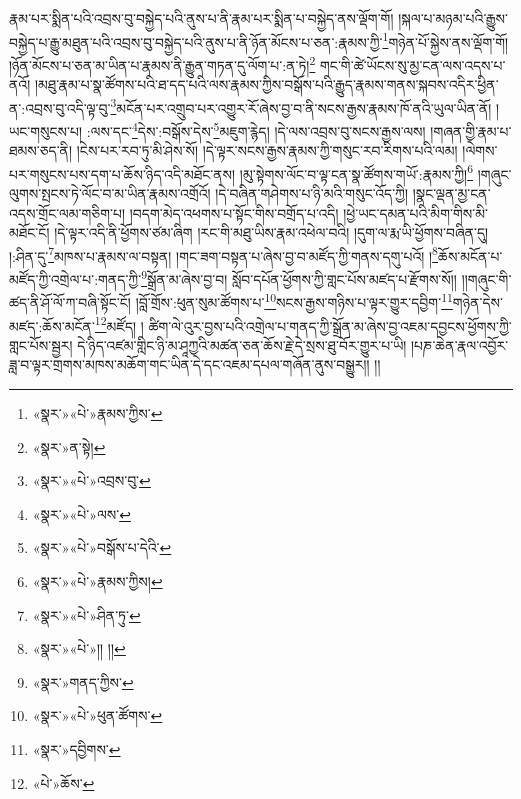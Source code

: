 རྣམ་པར་སྨིན་པའི་འབྲས་བུ་བསྐྱེད་པའི་ནུས་པ་ནི་རྣམ་པར་སྨིན་པ་བསྐྱེད་ནས་ལྡོག་གོ། །སྐལ་པ་མཉམ་པའི་རྒྱུས་བསྐྱེད་པ་རྒྱུ་མཐུན་པའི་འབྲས་བུ་བསྐྱེད་པའི་ནུས་པ་ནི་ཉོན་མོངས་པ་ཅན་:རྣམས་ཀྱི་\footnote{«སྣར་»«པེ་»རྣམས་ཀྱིས་}གཉེན་པོ་སྐྱེས་ནས་ལྡོག་གོ། །ཉོན་མོངས་པ་ཅན་མ་ཡིན་པ་རྣམས་ནི་རྒྱུན་གཏན་དུ་ལོག་པ་:ན་ཏེ།\footnote{«སྣར་»ན་སྟེ།} གང་གི་ཚེ་ཡོངས་སུ་མྱ་ངན་ལས་འདས་པ་ནའོ། །མཐུ་རྣམ་པ་སྣ་ཚོགས་པའི་ཐ་དད་པའི་ལས་རྣམས་ཀྱིས་བསྒོས་པའི་རྒྱུད་རྣམས་གནས་སྐབས་འདིར་ཕྱིན་ན་:འབྲས་བུ་འདི་ལྟ་བུ་\footnote{«སྣར་»«པེ་»འབྲས་བུ་}མངོན་པར་འགྲུབ་པར་འགྱུར་རོ་ཞེས་བྱ་བ་ནི་སངས་རྒྱས་རྣམས་ཁོ་ནའི་ཡུལ་ཡིན་ནོ། །ཡང་གསུངས་པ། :ལས་དང་\footnote{«སྣར་»«པེ་»ལས་}དེས་:བསྒོས་དེས་\footnote{«སྣར་»«པེ་»བསྒོས་པ་དེའི་}མཇུག་རྙེད། །དེ་ལས་འབྲས་བུ་སངས་རྒྱས་ལས། །གཞན་གྱི་རྣམ་པ་ཐམས་ཅད་ནི། །ངེས་པར་རབ་ཏུ་མི་ཤེས་སོ། །དེ་ལྟར་སངས་རྒྱས་རྣམས་ཀྱི་གསུང་རབ་རིགས་པའི་ལམ། །ལེགས་པར་གསུངས་པས་དག་པ་ཆོས་ཉིད་འདི་མཐོང་ནས། །མུ་སྟེགས་ལོང་བ་ལྟ་ངན་སྣ་ཚོགས་གཡོ་:རྣམས་ཀྱི།\footnote{«སྣར་»«པེ་»རྣམས་ཀྱིས།} །གཞུང་ལུགས་སྤངས་ཏེ་ལོང་བ་མ་ཡིན་རྣམས་འགྲོའོ། །དེ་བཞིན་གཤེགས་པ་ཉི་མའི་གསུང་འོད་ཀྱི། །སྣང་ལྡན་མྱ་ངན་འདས་གྲོང་ལམ་གཅིག་པ། །བདག་མེད་འཕགས་པ་སྟོང་གིས་བགྲོད་པ་འདི། །ཕྱེ་ཡང་དམན་པའི་མིག་གིས་མི་མཐོང་ངོ། །དེ་ལྟར་འདི་ནི་ཕྱོགས་ཙམ་ཞིག །རང་གི་མཐུ་ཡིས་རྣམ་འཕེལ་བའི། །དུག་ལ་རྨ་ཡི་ཕྱོགས་བཞིན་དུ། །:ཤིན་དུ་\footnote{«སྣར་»«པེ་»ཤིན་ཏུ་}མཁས་པ་རྣམས་ལ་བསྟན། །གང་ཟག་བསྟན་པ་ཞེས་བྱ་བ་མཛོད་ཀྱི་གནས་དགུ་པའོ། །\footnote{«སྣར་»«པེ་»།། །།}ཆོས་མངོན་པ་མཛོད་ཀྱི་འགྲེལ་པ་:གནད་ཀྱི་\footnote{«སྣར་»གནད་ཀྱིས་}སྒྲོན་མ་ཞེས་བྱ་བ། སློབ་དཔོན་ཕྱོགས་ཀྱི་གླང་པོས་མཛད་པ་རྫོགས་སོ།། །།གཞུང་གི་ཚད་ནི་ཤོ་ལོ་ཀ་བཞི་སྟོང་ངོ། །བློ་གྲོས་:ཕུན་སུམ་ཚོགས་པ་\footnote{«སྣར་»«པེ་»ཕུན་ཚོགས་}སངས་རྒྱས་གཉིས་པ་ལྟར་གྱུར་དབྱིག་\footnote{«སྣར་»དབྱིགས་}གཉེན་དེས་མཛད་:ཆོས་མངོན་\footnote{«པེ་»ཆོས་}མཛོད། །
ཚིག་ལེ་འུར་བྱས་པའི་འགྲེལ་པ་གནད་ཀྱི་སྒྲོན་མ་ཞེས་བྱ་འཇམ་དབྱངས་ཕྱོགས་ཀྱི་གླང་པོས་སྦྱར། དེ་ཉིད་འཛམ་གླིང་ཉི་མ་ཤཱཀྱའི་མཚན་ཅན་ཆོས་རྗེ་དེ་སྲས་ཐུ་བོར་གྱུར་པ་ཡི། །པཎ་ཆེན་རྣལ་འབྱོར་ཟླ་བ་ལྟར་གྲགས་མཁས་མཆོག་གང་ཡིན་དེ་དང་འཇམ་དཔལ་གཞོན་ནུས་བསྒྱུར།། །།